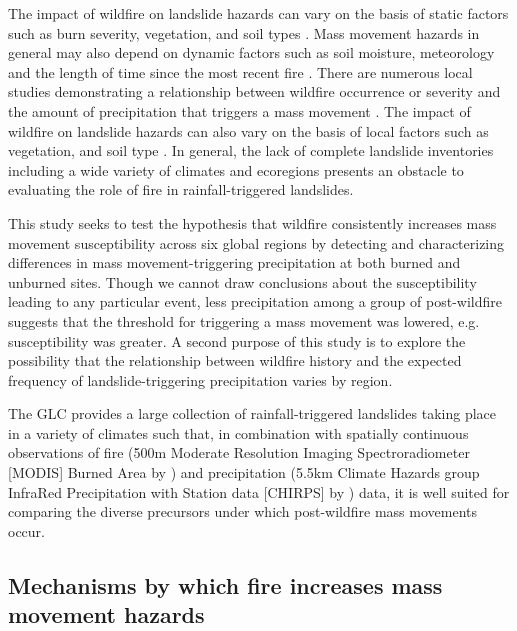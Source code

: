 \documentclass[nhess, manuscript]{copernicus}
\begin{document}
The impact of wildfire on landslide hazards can vary on the basis of static factors 
such as burn severity, vegetation, and soil types \citep{cannonPredictingProbabilityVolume2010,staley2018estimating}. Mass movement hazards in general may also depend on dynamic factors such as soil moisture, meteorology and
the length of time since the most recent fire \citep{kirschbaumSatelliteBasedAssessmentRainfallTriggered2018,degraffTimingSusceptibilityPostFire2015,mcguire2021time}. There are numerous local studies demonstrating a relationship between wildfire occurrence or severity and the amount of precipitation that triggers a mass movement \citep{cannonStormRainfallConditions2008,gartnerRelationsWildfireRelated2005, reneauSedimentDeliveryWildfire2007,riley2013frequency} . The impact of wildfire on landslide hazards can also vary on the basis of local factors such as vegetation, and soil type \citep{cannonPredictingProbabilityVolume2010, staley2018estimating}. In general, the lack of complete landslide inventories including a wide variety of climates and ecoregions presents an obstacle to evaluating the role of fire in rainfall-triggered landslides\citep{kloseMethodology2015}.

This study seeks to test the hypothesis that wildfire consistently increases mass movement susceptibility across six global regions by detecting and characterizing differences in mass movement-triggering precipitation at both burned and unburned sites. Though we cannot draw conclusions about the susceptibility leading to any particular event, less precipitation among a group of post-wildfire suggests that the threshold for triggering a mass movement was lowered, e.g. susceptibility was greater. A second purpose of this study is to explore the possibility that the relationship between wildfire history and the expected frequency of landslide-triggering precipitation varies by region.

The GLC provides a large collection of rainfall-triggered landslides taking place in a variety of climates such that, in combination with spatially continuous observations of fire (500m Moderate Resolution Imaging Spectroradiometer [MODIS] Burned Area by \citet{giglioCollectionMODISBurned2018}) and precipitation (5.5km Climate Hazards group InfraRed Precipitation with Station data [CHIRPS] by \citet{funkClimateHazardsInfrared2015}) data, it is well suited for comparing the diverse precursors under which post-wildfire mass movements occur.




\subsection{Mechanisms by which fire increases mass movement hazards}
\label{mechanisms-by-which-fire-increases-landslide-hazards}
\end{document}
